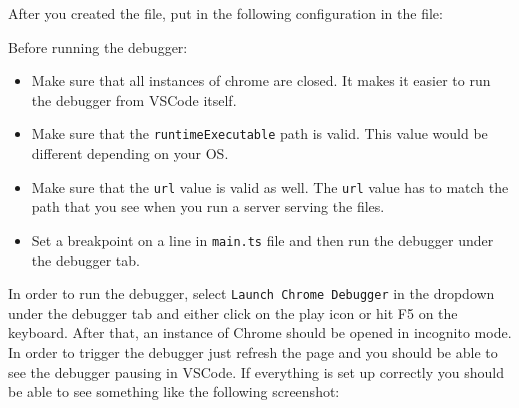 \documentclass[12pt,]{article}
\newenvironment{Shaded}{}{}
\newcommand{\KeywordTok}[1]{\textcolor[rgb]{0.00,0.00,1.00}{{#1}}}
\newcommand{\DataTypeTok}[1]{{#1}}
\newcommand{\StringTok}[1]{\textcolor[rgb]{0.00,0.50,0.50}{{#1}}}
\newcommand{\OtherTok}[1]{\textcolor[rgb]{1.00,0.25,0.00}{{#1}}}
\newcommand{\FunctionTok}[1]{{#1}}
\providecommand{\tightlist}{%
  \setlength{\itemsep}{0pt}\setlength{\parskip}{0pt}}
\begin{document}
After you created the file, put in the following configuration in the
file:

\begin{Shaded}
\end{Shaded}

Before running the debugger:

\begin{itemize}
\tightlist
\item
  Make sure that all instances of chrome are closed. It makes it easier
  to run the debugger from VSCode itself.
\item
  Make sure that the \texttt{runtimeExecutable} path is valid. This
  value would be different depending on your OS.
\item
  Make sure that the \texttt{url} value is valid as well. The
  \texttt{url} value has to match the path that you see when you run a
  server serving the files.
\item
  Set a breakpoint on a line in \texttt{main.ts} file and then run the
  debugger under the debugger tab.
\end{itemize}

In order to run the debugger, select \texttt{Launch\ Chrome\ Debugger}
in the dropdown under the debugger tab and either click on the play icon
or hit F5 on the keyboard. After that, an instance of Chrome should be
opened in incognito mode. In order to trigger the debugger just refresh
the page and you should be able to see the debugger pausing in VSCode.
If everything is set up correctly you should be able to see something
like the following screenshot:
\end{document}
